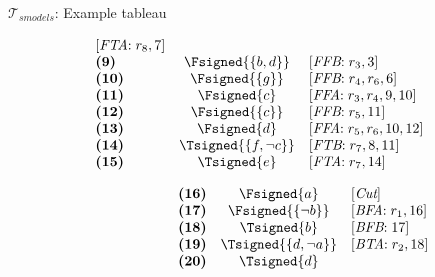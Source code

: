 \begin{frame}{$\mathcal{T}_{\textit{smodels}}$: Example tableau}
\begin{center}
\begin{minipage}[t]{16cm}
\begin{minipage}[t]{4.5cm}
\[\begin{array}{lcl}
  [\textit{FTA}{:}\;r_8, \text{7}]                 \\
\textbf{(9)}                                       &
  \Fsigned{\{b,d\}}                                &
  [\textit{FFB}{:}\;r_3, \text{3}]                 \\
\textbf{(10)}                                      &
  \Fsigned{\{g\}}                                  &
  [\textit{FFB}{:}\;r_4, r_6, \text{6}]            \\
\textbf{(11)}                                      &
  \Fsigned{c}                                      &
  [\textit{FFA}{:}\;r_3,r_4, \text{9}, \text{10}]  \\
\textbf{(12)}                                      &
  \Fsigned{\{c\}}                                  &
  [\textit{FFB}{:}\;r_5, \text{11}]                \\
\textbf{(13)}                                      &
  \Fsigned{d}                                      &
  [\textit{FFA}{:}\;r_5,r_6, \text{10}, \text{12}] \\
\textbf{(14)}                                      &
  \Tsigned{\{f,\neg c\}}                   &
  [\textit{FTB}{:}\;r_7, \text{8}, \text{11}]      \\
\textbf{(15)}                                      &
  \Tsigned{e}                                      &
  [\textit{FTA}{:}\;r_7, \text{14}]
\end{array}
\]
\end{minipage}
\begin{minipage}[t]{6cm}
\[
\hspace{2.2cm}
\begin{array}{lcl}
\textbf{(16)}                                      &
  \Fsigned{a}                                      &
  [\textit{Cut}]                                   \\
\textbf{(17)}                                      &
  \Fsigned{\{\neg b\}}                     &
  [\textit{BFA}{:}\; r_1, \text{16}]               \\
\textbf{(18)}                                      &
  \Tsigned{b}                                      &
  [\textit{BFB}{:}\; \text{17}]                    \\
\textbf{(19)}                                      &
  \Tsigned{\{d,\neg a\}}                   &
  [\textit{BTA}{:}\;r_2, \text{18}]                \\
\textbf{(20)}                                      &
  \Tsigned{d}                                      &

\end{array}\]
\end{minipage}
\end{minipage}
\end{center}
\end{frame}
